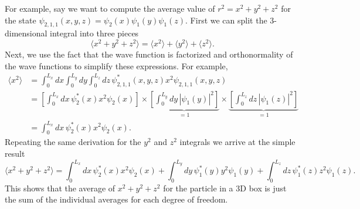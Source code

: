 \documentclass[../Main/chem331-notes.tex]{subfiles}
\begin{document}
For example, say we want to compute the average value of $r^2 = x^2 + y^2 + z^2$ for the state 
$\psi_{2,1,1}(x,y,z) =  \psi_{2}(x) \psi_{1}(y) \psi_{1}(z)$.
First we can split the 3-dimensional integral into three pieces
\begin{equation}
\langle x^2 + y^2 + z^2 \rangle = \langle x^2 \rangle + \langle y^2 \rangle + \langle z^2 \rangle.
\end{equation}
Next, we use the fact that the wave function is factorized and orthonormality of the wave functions to simplify these expressions. For example,
\begin{equation}
\begin{split}
\langle x^2 \rangle
& =
\int_0^{L_x} dx \int_0^{L_y} dy \int_0^{L_z} dz \,\psi_{2,1,1}^*(x,y,z) x^2 \psi_{2,1,1}(x,y,z) \\
& = \left[ \int_0^{L_x} dx \, \psi_{2}^*(x) x^2 \psi_{2}(x) \right]
\times \underbrace{\left[ \int_0^{L_y} dy \, | \psi_{1}(y)|^2 \right]}_{=1}
\times \underbrace{\left[  \int_0^{L_z} dz \, |\psi_{1}(z)|^2 \right]}_{=1} \\
& = \int_0^{L_x} dx \, \psi_{2}^*(x) x^2 \psi_{2}(x).
\end{split}
\end{equation}
Repeating the same derivation for the $y^2$ and $z^2$ integrals we arrive at the simple result
\begin{equation}
\langle x^2 + y^2 + z^2 \rangle =
\int_0^{L_x} dx \, \psi_{2}^*(x) x^2 \psi_{2}(x)
+ \int_0^{L_y} dy \, \psi_{1}^*(y) y^2 \psi_{1}(y)
+ \int_0^{L_z} dz \, \psi_{1}^*(z) z^2 \psi_{1}(z).
\end{equation}
This shows that the average of $x^2 + y^2 + z^2$ for the particle in a 3D box is just the sum of the individual averages for each degree of freedom. 
\end{document}
